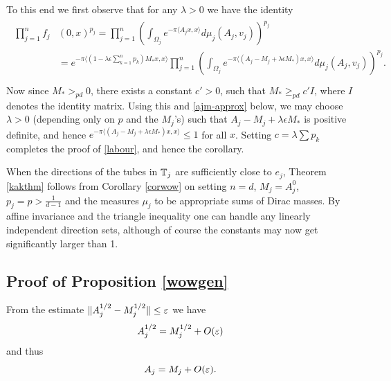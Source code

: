 To this end we first observe that for any $\lambda>0$ we have the identity
\begin{eqnarray*}
\begin{aligned}
\prod_{j=1}^{n}f_{j}&(0,x)^{p_{j}}
=\prod_{j=1}^{n}\left(\int_{\Omega_{j}}e^{-\pi\langle A_jx,x
\rangle}d\mu_j(A_j,v_j)\right)^{p_j}\\
&=e^{-\pi\langle (1-\lambda\epsilon\sum_{k=1}^{n}p_k)M_*x,x\rangle}
\prod_{j=1}^{n}\left(\int_{\Omega_j}e^{-\pi\langle (A_j-M_j+\lambda\epsilon M_*)x,x
\rangle}d\mu_j(A_j,v_j)\right)^{p_j}.\\
\end{aligned}
\end{eqnarray*}
Now since $M_*>_{pd}0$, there exists a constant $c'>0$, such that
$M_{*}\geq_{pd}c'I$, where $I$ denotes the identity matrix. Using this and
\eqref{ajm-approx} below, we may choose $\lambda>0$ (depending only on
$p$ and the $M_j$'s) such that $A_j-M_j+\lambda\epsilon M_{*}$ is positive
definite, and hence $e^{-\pi\langle (A_j-M_j+\lambda\epsilon M_*)x,x\rangle}
\leq 1$ for all $x$. Setting $c=\lambda\sum p_k$ completes the proof of
\eqref{labour}, and hence the corollary.
\begin{remark}  When the directions of the tubes in ${\mathbb{T}}_j$
are sufficiently close to $e_j$, Theorem \ref{kakthm} follows from
Corollary \ref{corwow}
on setting $n=d$, $M_j=A_j^0$, $p_{j}=p>\tfrac{1}{d-1}$ and the
measures $\mu_{j}$ to be appropriate sums of Dirac masses.
By affine invariance and the triangle inequality one can
handle any linearly independent direction sets, although of
course the constants may now get significantly larger than 1.
\end{remark}
\subsection*{Proof of Proposition \ref{wowgen}} From the estimate $\|
A_j^{1/2} - M_j^{1/2} \| \leq \varepsilon$
we have
\begin{equation}\label{ajm-sqrt}
 A_j^{1/2} = M_j^{1/2} + O(\varepsilon)
\end{equation}
and thus
\begin{equation}\label{ajm-approx} A_j = M_j + O(\varepsilon).
\end{equation}

